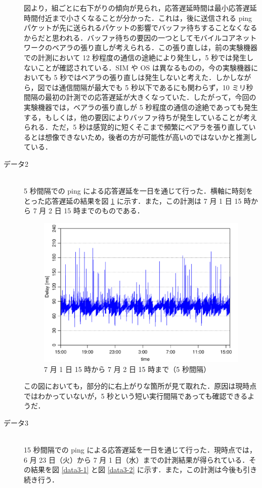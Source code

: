\documentclass[a4j]{jarticle}
\begin{document}
\begin{description}
図より，組ごとに右下がりの傾向が見られ，応答遅延時間は最小応答遅延時間付近まで小さくなることが分かった．これは，後に送信される ping パケットが先に送られるパケットの影響でバッファ待ちすることなくなるからだと思われる．バッファ待ちの要因の一つとしてモバイルコアネットワークのベアラの張り直しが考えられる．この張り直しは，前の実験機器での計測において 12 秒程度の通信の途絶により発生し，5 秒では発生しないことが確認されている．SIM や OS は異なるものの，今の実験機器においても 5 秒ではベアラの張り直しは発生しないと考えた．しかしながら，図では通信間隔が最大でも 5 秒以下であるにも関わらず，10 ミリ秒間隔の最初の計測での応答遅延が大きくなっていた．したがって，今回の実験機器では，ベアラの張り直しが 5 秒程度の通信の途絶であっても発生する，もしくは，他の要因によりバッファ待ちが発生していることが考えられる．ただ，5 秒は感覚的に短くそこまで頻繁にベアラを張り直しているとは想像できないため，後者の方が可能性が高いのではないかと推測している．
\item[データ2]　\\
5 秒間隔での ping による応答遅延を一日を通じて行った．横軸に時刻をとった応答遅延の結果を図 \ref{data2} に示す．また，この計測は 7 月 1 日 15 時から 7 月 2 日 15 時までのものである．
\begin{figure}[tb]
\centering
\includegraphics[width=\hsize]{plot.pdf}
\caption{ 7 月 1 日 15 時から 7 月 2 日 15 時まで（5 秒間隔）}
\label{data2}
\end{figure}
この図においても，部分的に右上がりな箇所が見て取れた．原因は現時点ではわかっていないが，5 秒という短い実行間隔であっても確認できるようだ．
\item[データ3]　\\
15 秒間隔での ping による応答遅延を一日を通じて行った．現時点では，6 月 23 日（火）から 7 月 1 日（水）までの計測結果が得られている．その結果を図 \ref{data3-1} と図 \ref{data3-2} に示す．また，この計測は今後も引き続き行う．

\end{description}
\end{document}
